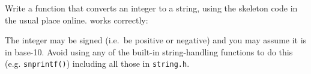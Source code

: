 
\begin{exercise}
Write a function that converts an integer
to a string, using the skeleton code in the usual place online.
works correctly:

The integer may be signed (i.e.\ be positive or negative)
and you may assume it is in base-10.
Avoid using any of the built-in string-handling functions
to do this (e.g. \verb^snprintf()^)
including all those in \verb^string.h^.
\end{exercise}

